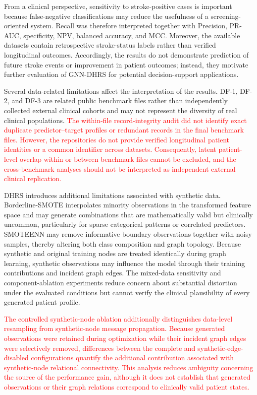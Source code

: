 \documentclass[pdflatex,sn-mathphys-num]{sn-jnl}%
\theoremstyle{thmstyleone}%
\theoremstyle{thmstyletwo}%
\theoremstyle{thmstylethree}%
\begin{document}
{From a clinical perspective, sensitivity to stroke-positive cases is important
because false-negative classifications may reduce the usefulness of a
screening-oriented system.
 {
Recall was therefore interpreted together with Precision, PR-AUC, specificity,
NPV, balanced accuracy, and MCC. Moreover, the available datasets contain
retrospective stroke-status labels rather than verified longitudinal outcomes.
Accordingly, the results do not demonstrate prediction of future stroke events
or improvement in patient outcomes; instead, they motivate further evaluation
of GNN-DHRS for potential decision-support applications.
}

 {
Several data-related limitations affect the interpretation of the results.
DF-1, DF-2, and DF-3 are related public benchmark files rather than
independently collected external clinical cohorts and may not represent the
diversity of real clinical populations. \textcolor{red}{
The within-file record-integrity audit did not identify exact duplicate
predictor--target profiles or redundant records in the final benchmark files.
However, the repositories do not provide verified longitudinal patient
identities or a common identifier across datasets. Consequently, latent
patient-level overlap within or between benchmark files cannot be excluded,
and the cross-benchmark analyses should not be interpreted as independent
external clinical replication.
}
}

 {
DHRS introduces additional limitations associated with synthetic data.
Borderline-SMOTE interpolates minority observations in the transformed feature
space and may generate combinations that are mathematically valid but
clinically uncommon, particularly for sparse categorical patterns or
correlated predictors. SMOTEENN may remove informative boundary observations
together with noisy samples, thereby altering both class composition and graph
topology. Because synthetic and original training nodes are treated
identically during graph learning, synthetic observations may influence the
model through their training contributions and incident graph edges. The
mixed-data sensitivity and component-ablation experiments reduce concern about
substantial distortion under the evaluated conditions but cannot verify the
clinical plausibility of every generated patient profile.
}

\textcolor{red}{
The controlled synthetic-node ablation additionally distinguishes
data-level resampling from synthetic-node message propagation. Because
generated observations were retained during optimization while their incident
graph edges were selectively removed, differences between the complete and
synthetic-edge-disabled configurations quantify the additional contribution
associated with synthetic-node relational connectivity. This analysis reduces
ambiguity concerning the source of the performance gain, although it does not
establish that generated observations or their graph relations correspond to
clinically valid patient states.
}

}
\end{document}
